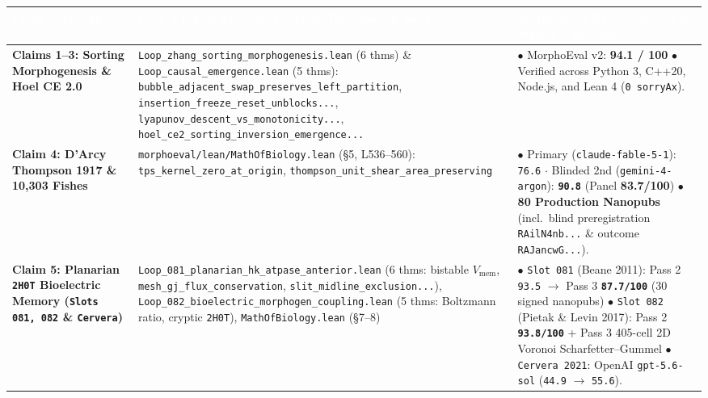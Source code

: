 \documentclass[10pt,a4paper]{article}
\begin{document}
\begin{table}[h!]
\centering
\renewcommand{\arraystretch}{1.08}
\scriptsize
\begin{tabular}{@{}p{}p{}p{}@{}}
\toprule
\rowcolor{navybg}
\textcolor{white}{\textbf{Claim / Module}} & \textcolor{white}{\textbf{Lean 4 File \& Machine-Checked Theorems (\texttt{0 sorry})}} & \textcolor{white}{\textbf{MorphoEval Referee Scores \& Signed Nanopubs}} \\
\midrule
\rowcolor{softgray}
\textbf{Claims 1--3: Sorting Morphogenesis \& Hoel CE 2.0} & \texttt{Loop\_zhang\_sorting\_morphogenesis.lean} (6 thms) \& \texttt{Loop\_causal\_emergence.lean} (5 thms): \texttt{bubble\_adjacent\_swap\_preserves\_left\_partition}, \texttt{insertion\_freeze\_reset\_unblocks...}, \texttt{lyapunov\_descent\_vs\_monotonicity...}, \texttt{hoel\_ce2\_sorting\_inversion\_emergence...} & $\bullet$ MorphoEval v2: \textbf{94.1 / 100}\newline
$\bullet$ Verified across Python 3, C++20, Node.js, and Lean 4 (\texttt{0 sorryAx}). \\
\textbf{Claim 4: D'Arcy Thompson 1917 \& 10,303 Fishes} & \texttt{morphoeval/lean/MathOfBiology.lean} (\S5, L536--560): \texttt{tps\_kernel\_zero\_at\_origin}, \texttt{thompson\_unit\_shear\_area\_preserving} & $\bullet$ Primary (\texttt{claude-fable-5-1}): \texttt{76.6} $\cdot$ Blinded 2nd (\texttt{gemini-4-argon}): \textbf{\texttt{90.8}} (Panel \textbf{83.7/100})\newline
$\bullet$ \textbf{80 Production Nanopubs} (incl.\ blind preregistration \texttt{RAilN4nb...} \& outcome \texttt{RAJancwG...}). \\
\rowcolor{softgray}
\textbf{Claim 5: Planarian \texttt{2H0T} Bioelectric Memory (\texttt{Slots 081, 082} \& \texttt{Cervera})} & \texttt{Loop\_081\_planarian\_hk\_atpase\_anterior.lean} (6 thms: bistable $V_{\mathrm{mem}}$, \texttt{mesh\_gj\_flux\_conservation}, \texttt{slit\_midline\_exclusion...}), \texttt{Loop\_082\_bioelectric\_\allowbreak morphogen\_coupling.lean} (5 thms: Boltzmann ratio, cryptic \texttt{2H0T}), \texttt{MathOfBiology.lean} (\S7--8) & $\bullet$ \texttt{Slot 081} (Beane 2011): Pass 2 \texttt{93.5} $\to$ Pass 3 \textbf{\texttt{87.7/100}} (30 signed nanopubs)\newline
$\bullet$ \texttt{Slot 082} (Pietak \& Levin 2017): Pass 2 \textbf{\texttt{93.8/100}} + Pass 3 405-cell 2D Voronoi Scharfetter--Gummel\newline
$\bullet$ \texttt{Cervera 2021}: OpenAI \texttt{gpt-5.6-sol} (\texttt{44.9} $\to$ \texttt{55.6}). \\

\end{tabular}
\end{table}
\end{document}
